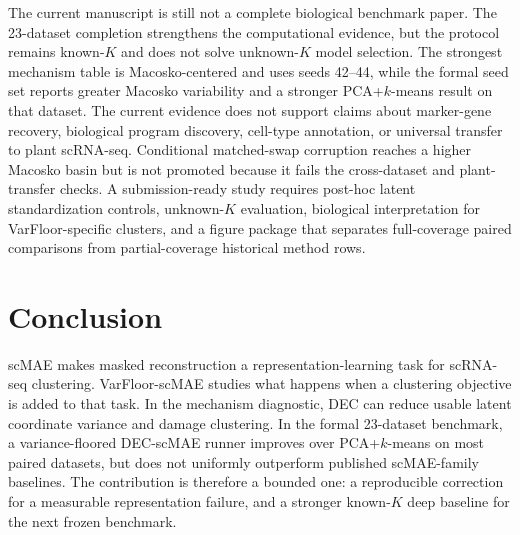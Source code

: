 \documentclass[11pt]{article}
\begin{document}
The current manuscript is still not a complete biological benchmark paper. The 23-dataset completion strengthens the computational evidence, but the protocol remains known-$K$ and does not solve unknown-$K$ model selection. The strongest mechanism table is Macosko-centered and uses seeds 42--44, while the formal seed set reports greater Macosko variability and a stronger PCA+$k$-means result on that dataset. The current evidence does not support claims about marker-gene recovery, biological program discovery, cell-type annotation, or universal transfer to plant scRNA-seq. Conditional matched-swap corruption reaches a higher Macosko basin but is not promoted because it fails the cross-dataset and plant-transfer checks. A submission-ready study requires post-hoc latent standardization controls, unknown-$K$ evaluation, biological interpretation for VarFloor-specific clusters, and a figure package that separates full-coverage paired comparisons from partial-coverage historical method rows.

\section{Conclusion}

scMAE makes masked reconstruction a representation-learning task for scRNA-seq clustering. VarFloor-scMAE studies what happens when a clustering objective is added to that task. In the mechanism diagnostic, DEC can reduce usable latent coordinate variance and damage clustering. In the formal 23-dataset benchmark, a variance-floored DEC-scMAE runner improves over PCA+$k$-means on most paired datasets, but does not uniformly outperform published scMAE-family baselines. The contribution is therefore a bounded one: a reproducible correction for a measurable representation failure, and a stronger known-$K$ deep baseline for the next frozen benchmark.



\end{document}
